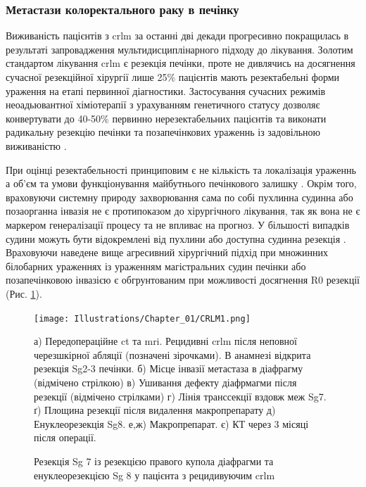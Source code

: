 \begin{refsection}
\subsubsection{Метастази колоректального раку в печінку}

Виживаність пацієнтів з \acrshort{crlm} за останні дві декади прогресивно покращилась в результаті запровадження мультидисциплінарного підходу до лікування. Золотим стандартом лікування \acrshort{crlm} є резекція печінки, проте не дивлячись на досягнення сучасної резекційної хірургії лише 25\% пацієнтів мають резектабельні форми ураження на етапі первинної діагностики. Застосування сучасних режимів неоадьювантної хіміотерапії з урахуванням генетичного статусу дозволяє конвертувати до 40-50\% первинно нерезектабельних пацієнтів та виконати радикальну резекцію печінки та позапечінкових ураженнь із задовільною виживаністю \cite{Adam2019a}. 

При оцінці резектабельності принциповим є не кількість та локалізація ураженнь а об'єм та умови функціонування майбутнього печінкового залишку \cite{Allard2017}. Окрім того, враховуючи системну природу захворювання сама по собі пухлинна судинна або позаорганна інвазія не є протипоказом до хірургічного лікування, так як вона не є маркером генералізації процесу та не впливає на прогноз. У більшості випадків судини можуть бути відокремлені від пухлини або доступна судинна резекція \cite{Torzilli2017}. Враховуючи наведене вище агресивний хірургічний підхід при множинних білобарних ураженнях із ураженням магістральних судин печінки або позапечінковою інвазією є обгрунтованим при можливості досягнення R0 резекції (Рис. \ref{fig:CRLM1}).

\begin{figure}[!ht]
\caption{Резекція Sg 7 із резекцією правого купола діафрагми та енуклеорезекцією Sg 8 у пацієнта з рецидивуючим \acrshort{crlm}}

\texttt{[image: Illustrations/Chapter\_01/CRLM1.png]}
\label{fig:CRLM1}

\medskip
\small
а) Передопераційне \acrshort{ct} та \acrshort{mri}. Рецидивні \acrshort{crlm} після неповної черезшкірної абляції (позначені зірочками). В анамнезі відкрита резекція Sg2-3 печінки. б) Місце інвазії метастаза в діафрагму (відмічено стрілкою)  в) Ушивання дефекту діафрмагми після резекції (відмічено стрілками)  г) Лінія транссекції вздовж меж Sg7. ґ) Площина резекції після видалення макропрепарату д) Енуклеорезекція Sg8. е,ж) Макропрепарат. є) КТ через 3 місяці після операції.


\end{figure}
\end{refsection}
